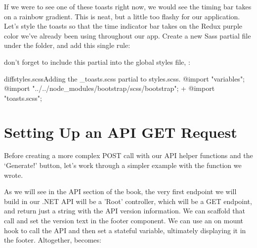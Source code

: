 \documentclass[a4paper,headinclude=on,footinclude=on,12pt,oneside]{scrbook}
\begin{document}
If we were to see one of these toasts right now, we would see the timing bar takes on a rainbow gradient. This is neat, but a little too flashy for our application. Let's style the toasts so that the time indicator bar takes on the Redux purple color we've already been using throughout our app. Create a new Sass partial file  under the  folder, and add this single rule:


don't forget to include this partial into the global styles file, :

\begin{codeInput}{diff}{styles.scss}{Adding the \_toasts.scss partial to styles.scss.}
@import "variables";
@import "../../node_modules/bootstrap/scss/bootstrap";
+ @import "toasts.scss";
\end{codeInput}

\section{Setting Up an API GET Request}

Before creating a more complex POST call with our API helper functions and the `Generate!' button, let's work through a simpler example with the  function we wrote. 

As we will see in the API section of the book, the very first endpoint we will build in our .NET API will be a 'Root' controller, which will be a GET endpoint, and return just a string with the API version information. We can scaffold that call and set the version text in the footer component. We can use an on mount  hook to call the API and then set a stateful variable, ultimately displaying it in the footer. Altogether,  becomes:
\end{document}
